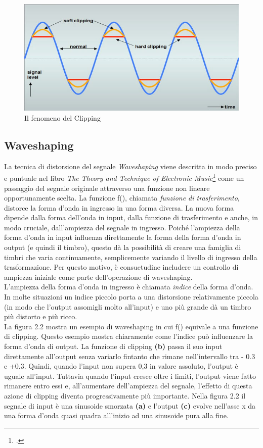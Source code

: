 \begin{figure}[!h] 
    \centering 
    \includegraphics[width=0.8\columnwidth]{immagini/cap2/clipping.jpg}
    \caption{Il fenomeno del Clipping}
\end{figure}

\subsection{Waveshaping}
La tecnica di distorsione del segnale \textit{Waveshaping} viene descritta in modo preciso e puntuale nel libro \textit{The Theory and Technique of Electronic Music}\footcite{puckette:theoryandtechniqueofelectronicmusic} come un passaggio del segnale originale attraverso una funzione non lineare opportunamente scelta. La funzione f(), chiamata \textit{funzione di trasferimento}, distorce la forma d'onda in ingresso in una forma diversa. La nuova forma dipende dalla forma dell'onda in input, dalla funzione di trasferimento e anche, in modo cruciale, dall'ampiezza del segnale in ingresso. Poiché l'ampiezza della forma d'onda in input influenza direttamente la forma della forma d'onda in output (e quindi il timbro), questo dà la possibilità di creare una famiglia di timbri che varia continuamente, semplicemente variando il livello di ingresso della trasformazione. Per questo motivo, è consuetudine includere un controllo di ampiezza iniziale come parte dell'operazione di waveshaping. \\ 
L'ampiezza della forma d'onda in ingresso è chiamata \textit{indice} della forma d'onda. In molte situazioni un indice piccolo porta a una distorsione relativamente piccola (in modo che l'output assomigli molto all'input) e uno più grande dà un timbro più distorto e più ricco. \\
La figura 2.2 mostra un esempio di waveshaping in cui f() equivale a una funzione di clipping. Questo esempio mostra chiaramente come l'indice può influenzare la forma d'onda di output. La funzione di clipping \textbf{(b)} passa il suo input direttamente all'output senza variarlo fintanto che rimane nell'intervallo tra - 0.3 e +0.3. Quindi, quando l'input non supera 0,3 in valore assoluto, l'output è uguale all'input. Tuttavia quando l'input cresce oltre i limiti, l'output viene fatto rimanere entro essi e, all'aumentare dell'ampiezza del segnale, l'effetto di questa azione di clipping diventa progressivamente più importante. Nella figura 2.2 il segnale di input è una sinusoide smorzata \textbf{(a)} e l'output \textbf{(c)} evolve nell'asse x da una forma d'onda quasi quadra all'inizio ad una sinusoide pura alla fine.
